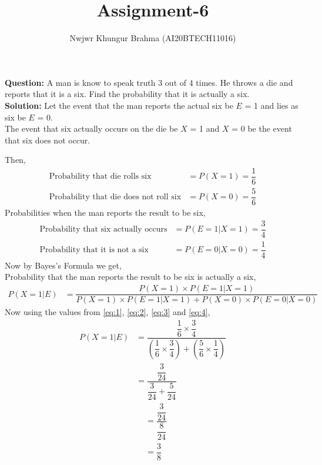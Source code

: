 \documentclass[journal,12pt,twocolumn]{IEEEtran}
\title{Assignment-6}
\author{Nwjwr Khungur Brahma (AI20BTECH11016)}
\begin{document}
\maketitle
\textbf{Question:}
A man is know to speak truth 3 out of 4 times. He throws a die and reports that it is a six. Find the probability that it is actually a six.\\
\textbf{Solution:}
Let the event that the man reports the actual six be $E$ = 1 and lies as six be $E$ = 0.\\The event that six actually occurs on the die be $X$ = 1 and $X$ = 0 be the event that six does not occur.\\
\begin{table}[ht!]

\end{table}
Then,
\begin{align}
\text{Probability that die rolls six}&=P(X=1)=\dfrac{1}{6}\label{eq:1}\\
\text{Probability that die does not roll six}&=P(X=0)=\dfrac{5}{6}\label{eq:2}
\end{align}
Probabilities when the man reports the result to be six,
\begin{align}
\text{Probability that six actually occurs}&=P(E=1|X=1)=\dfrac{3}{4}\label{eq:3}\\
\text{Probability that it is not a six}&=P(E=0|X=0)=\dfrac{1}{4}\label{eq:4}
\end{align}
Now by Bayes's Formula we get,\\
Probability that the man reports the result to be six is actually a six,\\
\begin{align}
P(X=1|E)&=\dfrac{P(X=1)\times P(E=1|X=1)}{P(X=1)\times P(E=1|X=1)+P(X=0)\times P(E=0|X=0)}
\end{align}
Now using the values from \eqref{eq:1}, \eqref{eq:2}, \eqref{eq:3} and \eqref{eq:4},
\begin{align}
P(X=1|E)&=\dfrac{\dfrac{1}{6}\times \dfrac{3}{4}}{\left(\dfrac{1}{6}\times \dfrac{3}{4}\right)+\left(\dfrac{5}{6}\times\dfrac{1}{4}\right)}\\
&=\dfrac{\dfrac{3}{24}}{\dfrac{3}{24}+\dfrac{5}{24}}
\end{align}
\begin{align}
&=\dfrac{\dfrac{3}{24}}{\dfrac{8}{24}}\\
&=\dfrac{3}{8}
\end{align}
\end{document}
